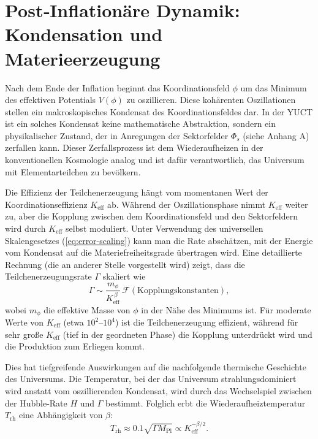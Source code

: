\documentclass[11pt,a4paper]{article}
\newcommand{\Keff}{K_{\mathrm{eff}}}
\begin{document}
	\section{Post‑Inflationäre Dynamik: Kondensation und Materieerzeugung}
	\label{sec:postinflation}
	
	Nach dem Ende der Inflation beginnt das Koordinationsfeld \(\phi\) um das Minimum des effektiven Potentials \(V(\phi)\) zu oszillieren. Diese kohärenten Oszillationen stellen ein makroskopisches Kondensat des Koordinationsfeldes dar. In der YUCT ist ein solches Kondensat keine mathematische Abstraktion, sondern ein physikalischer Zustand, der in Anregungen der Sektorfelder \(\Phi_s\) (siehe Anhang A) zerfallen kann. Dieser Zerfallsprozess ist dem Wiederaufheizen in der konventionellen Kosmologie analog und ist dafür verantwortlich, das Universum mit Elementarteilchen zu bevölkern.
	
	Die Effizienz der Teilchenerzeugung hängt vom momentanen Wert der Koordinationseffizienz \(\Keff\) ab. Während der Oszillationsphase nimmt \(\Keff\) weiter zu, aber die Kopplung zwischen dem Koordinationsfeld und den Sektorfeldern wird durch \(\Keff\) selbst moduliert. Unter Verwendung des universellen Skalengesetzes (\ref{eq:error-scaling}) kann man die Rate abschätzen, mit der Energie vom Kondensat auf die Materiefreiheitsgrade übertragen wird. Eine detaillierte Rechnung (die an anderer Stelle vorgestellt wird) zeigt, dass die Teilchenerzeugungsrate \(\Gamma\) skaliert wie
	\begin{equation}
		\Gamma \sim \frac{m_\phi}{\Keff^{\,\beta}} \, \mathcal{F}(\text{Kopplungskonstanten}),
		\label{eq:gamma}
	\end{equation}
	wobei \(m_\phi\) die effektive Masse von \(\phi\) in der Nähe des Minimums ist. Für moderate Werte von \(\Keff\) (etwa \(10^2\)–\(10^4\)) ist die Teilchenerzeugung effizient, während für sehr große \(\Keff\) (tief in der geordneten Phase) die Kopplung unterdrückt wird und die Produktion zum Erliegen kommt.
	
	Dies hat tiefgreifende Auswirkungen auf die nachfolgende thermische Geschichte des Universums. Die Temperatur, bei der das Universum strahlungsdominiert wird anstatt vom oszillierenden Kondensat, wird durch das Wechselspiel zwischen der Hubble‑Rate \(H\) und \(\Gamma\) bestimmt. Folglich erbt die Wiederaufheiztemperatur \(T_{\mathrm{rh}}\) eine Abhängigkeit von \(\beta\):
	\begin{equation}
		T_{\mathrm{rh}} \approx 0.1 \sqrt{\Gamma M_{\mathrm{Pl}}} \propto \Keff^{-\beta/2}.
		\label{eq:trh}
	\end{equation}
	
\end{document}
